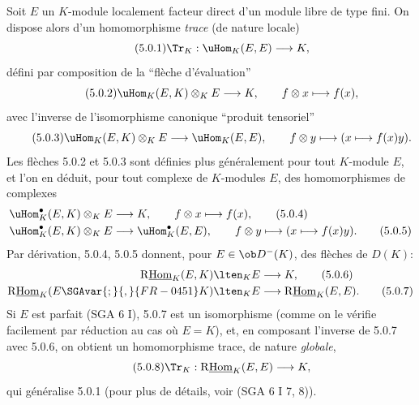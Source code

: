 Soit $E$ un $K$-module localement facteur direct d'un module libre de type fini. On dispose alors d'un homomorphisme \emph{trace} (de nature locale)
\begin{equation}\tag{5.0.1}
\Tr_K:\uHom_K(E,E)\longrightarrow K,
\end{equation}
défini par composition de la ``flèche d'évaluation''
\begin{equation}\tag{5.0.2}
\uHom_K(E,K)\otimes_KE\longrightarrow K,\qquad f\otimes x\longmapsto f(x),
\end{equation}
avec l'inverse de l'isomorphisme canonique ``produit tensoriel''
\begin{equation}\tag{5.0.3}
\uHom_K(E,K)\otimes_KE\longrightarrow\uHom_K(E,E),\qquad f\otimes y\longmapsto (x\longmapsto f(x)y).
\end{equation}
Les flèches 5.0.2 et 5.0.3 sont définies plus généralement pour tout $K$-module $E$, et l'on en déduit, pour tout complexe de $K$-modules $E$, des homomorphismes de complexes
\begin{align}
\uHom_K^\bullet(E,K)\otimes_KE&\longrightarrow K,\qquad f\otimes x\longmapsto f(x),\tag{5.0.4}\\
\uHom_K^\bullet(E,K)\otimes_KE&\longrightarrow \uHom_K^\bullet(E,E),\qquad f\otimes y\longmapsto (x\longmapsto f(x)y).\tag{5.0.5}
\end{align}
Par dérivation, 5.0.4, 5.0.5 donnent, pour $E\in\ob D^-(K)$, des flèches de $D(K)$:
\begin{align}
\mathrm{R}\underline{\mathrm{Hom}}_K(E,K)\lten_KE&\longrightarrow K,\tag{5.0.6}\\
\mathrm{R}\underline{\mathrm{Hom}}_K(E\SGAvar{;}{,}{FR-0451}K)\lten_KE&\longrightarrow\mathrm{R}\underline{\mathrm{Hom}}_K(E,E).\tag{5.0.7}
\end{align}
Si $E$ est
parfait (SGA 6 I), 5.0.7 est un isomorphisme (comme on le vérifie facilement par réduction au cas où $E=K$), et, en composant l'inverse de 5.0.7 avec 5.0.6, on obtient un homomorphisme trace, de nature \emph{globale},
\begin{equation}\tag{5.0.8}
\Tr_K:\mathrm{R}\underline{\mathrm{Hom}}_K(E,E)\longrightarrow K,
\end{equation}
qui généralise 5.0.1 (pour plus de détails, voir (SGA 6 I 7, 8)).

